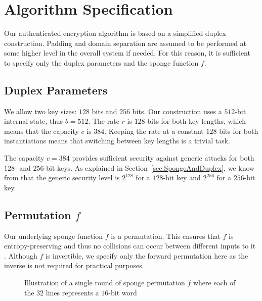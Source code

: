 \section{Algorithm Specification}
\label{sec:AlgorithmSpec}
Our authenticated encryption algorithm is based on a simplified duplex construction.
Padding and domain separation are assumed to be performed at some higher level in the overall system if needed.
For this reason, it is sufficient to specify only the duplex parameters and the sponge function $f$.

\subsection{Duplex Parameters}
We allow two key sizes: $128$ bits and $256$ bits.
Our construction uses a $512$-bit internal state, thus $b = 512$.
The rate $r$ is $128$ bits for both key lengths, which means that the capacity $c$ is $384$.
Keeping the rate at a constant $128$ bits for both instantiations means that switching between key lengths is a trivial task.

The capacity $c = 384$ provides sufficient security against generic attacks for both $128$- and $256$-bit keys.
As explained in Section~\ref{sec:SpongeAndDuplex}, we know from \cite{Jovanovic2014_Beyond} that the generic security level is $2^{128}$ for a $128$-bit key and $2^{256}$ for a $256$-bit key.

\subsection{Permutation $f$}
Our underlying sponge function $f$ is a permutation.
This ensures that $f$ is entropy-preserving and thus no collisions can occur between different inputs to it \cite{Bertoni2011_SpongeFunctions}.
Although $f$ is invertible, we specify only the forward permutation here as the inverse is not required for practical purposes.



\begin{figure}
\centering

\caption{Illustration of a single round of sponge permutation $f$ where each of the $32$ lines represents a $16$-bit word}
\label{fig:Round}
\end{figure}


